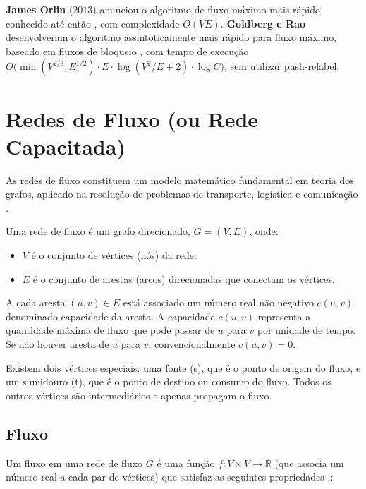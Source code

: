 \documentclass[12pt]{article}
\begin{document}
\textbf{James Orlin} (2013) anunciou o algoritmo de fluxo máximo mais rápido conhecido até então \cite{orlin2013maxflow}, com complexidade $O(VE)$. \textbf{Goldberg e Rao} desenvolveram o algoritmo assintoticamente mais rápido para fluxo máximo, baseado em fluxos de bloqueio \cite{goldberg1998}, com tempo de execução $O\big(\min(V^{2/3}, E^{1/2}) \cdot E \cdot \log(V^2/E + 2) \cdot \log C \big)$, sem utilizar push-relabel.



\newpage
\section{Redes de Fluxo  (ou Rede Capacitada)} 

As redes de fluxo constituem um modelo matemático fundamental em teoria dos grafos, aplicado na resolução de problemas de transporte, logística e comunicação \cite{ahuja1993,cormen2009}.

Uma rede de fluxo é um grafo direcionado, $G = (V, E)$, onde:

\begin{itemize}
    \item $V$ é o conjunto de vértices (nós) da rede.
    \item $E$ é o conjunto de arestas (arcos) direcionadas que conectam os vértices.
\end{itemize}

\noindent A cada aresta $(u, v) \in E$ está associado um número real não negativo $c(u, v)$, denominado capacidade da aresta. A capacidade $c(u, v)$ representa a quantidade máxima de fluxo que pode passar de $u$ para $v$ por unidade de tempo. Se não houver aresta de $u$ para $v$, convencionalmente $c(u, v) = 0$.

\noindent Existem dois vértices especiais: uma fonte (s), que é o ponto de origem do fluxo, e um sumidouro (t), que é o ponto de destino ou consumo do fluxo. Todos os outros vértices são intermediários e apenas propagam o fluxo.

\subsection{Fluxo} 

Um fluxo em uma rede de fluxo $G$ é uma função $f: V \times V \rightarrow \mathbb{R}$ (que associa um número real a cada par de vértices) que satisfaz as seguintes propriedades \cite{ahuja1993},:
\end{document}
